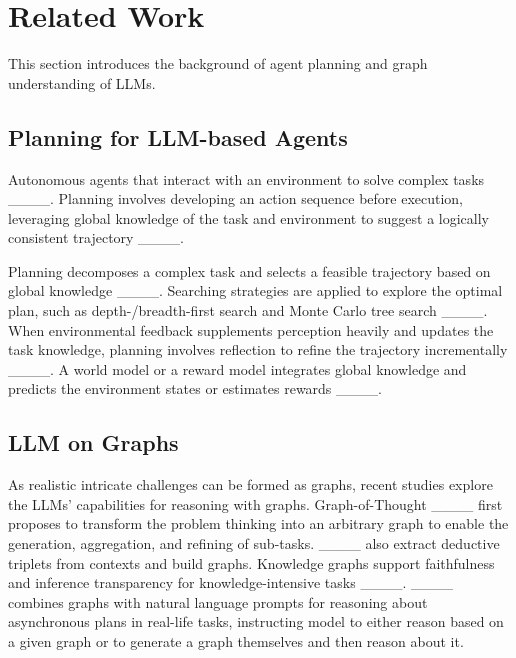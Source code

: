 \section{Related Work}
This section introduces the background of agent planning and graph understanding of LLMs.

\subsection{Planning for LLM-based Agents}
Autonomous agents that interact with an environment to solve complex tasks ____. Planning involves developing an action sequence before execution, leveraging global knowledge of the task and environment to suggest a logically consistent trajectory ____. 

Planning decomposes a complex task and selects a feasible trajectory based on global knowledge ____.
Searching strategies are applied to explore the optimal plan, such as depth-/breadth-first search and Monte Carlo tree search ____.
When environmental feedback supplements perception heavily and updates the task knowledge, planning involves reflection to refine the trajectory incrementally ____.
A world model or a reward model integrates global knowledge and predicts the environment states or estimates rewards ____.

\subsection{LLM on Graphs}
As realistic intricate challenges can be formed as graphs, recent studies explore the LLMs' capabilities for reasoning with graphs.
Graph-of-Thought ____ first proposes to transform the problem thinking into an arbitrary graph to enable the generation, aggregation, and refining of sub-tasks.
____ also extract deductive triplets from contexts and build graphs.
Knowledge graphs support faithfulness and inference transparency for knowledge-intensive tasks ____. ____ combines graphs with natural language prompts for reasoning about asynchronous plans in real-life tasks, instructing model to either reason based on a given graph or to generate a graph themselves and then reason about it.


